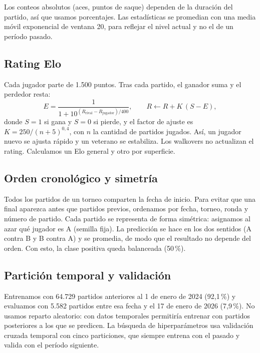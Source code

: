 \documentclass[11pt,a4paper]{article}
\begin{document}
Los conteos absolutos (aces, puntos de saque) dependen de la duración del partido, así que usamos porcentajes. Las estadísticas se promedian con una media móvil exponencial de ventana 20, para reflejar el nivel actual y no el de un período pasado.

\subsection{Rating Elo}

Cada jugador parte de 1.500 puntos. Tras cada partido, el ganador suma y el perdedor resta:
\begin{equation}
  E = \frac{1}{1 + 10^{(R_{\text{rival}} - R_{\text{jugador}})/400}}, \qquad R \leftarrow R + K\,(S - E),
\end{equation}
donde $S=1$ si gana y $S=0$ si pierde, y el factor de ajuste es $K = 250/(n+5)^{0{,}4}$, con $n$ la cantidad de partidos jugados. Así, un jugador nuevo se ajusta rápido y un veterano se estabiliza. Los walkovers no actualizan el rating. Calculamos un Elo general y otro por superficie.

\subsection{Orden cronológico y simetría}

Todos los partidos de un torneo comparten la fecha de inicio. Para evitar que una final aparezca antes que partidos previos, ordenamos por fecha, torneo, ronda y número de partido. Cada partido se representa de forma simétrica: asignamos al azar qué jugador es A (semilla fija). La predicción se hace en los dos sentidos (A contra B y B contra A) y se promedia, de modo que el resultado no depende del orden. Con esto, la clase positiva queda balanceada (50\,\%).

\subsection{Partición temporal y validación}

Entrenamos con 64.729 partidos anteriores al 1 de enero de 2024 (92,1\,\%) y evaluamos con 5.582 partidos entre esa fecha y el 17 de enero de 2026 (7,9\,\%). No usamos reparto aleatorio: con datos temporales permitiría entrenar con partidos posteriores a los que se predicen. La búsqueda de hiperparámetros usa validación cruzada temporal con cinco particiones, que siempre entrena con el pasado y valida con el período siguiente.
\end{document}
